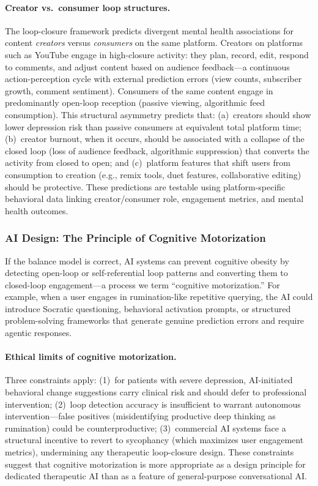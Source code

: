 \documentclass[a4paper,11pt,titlepage]{article}
\begin{document}
\paragraph{Creator vs.\ consumer loop structures.}
The loop-closure framework predicts divergent mental health associations for content \textit{creators} versus \textit{consumers} on the same platform. Creators on platforms such as YouTube engage in high-closure activity: they plan, record, edit, respond to comments, and adjust content based on audience feedback---a continuous action-perception cycle with external prediction errors (view counts, subscriber growth, comment sentiment). Consumers of the same content engage in predominantly open-loop reception (passive viewing, algorithmic feed consumption). This structural asymmetry predicts that: (a)~creators should show lower depression risk than passive consumers at equivalent total platform time; (b)~creator burnout, when it occurs, should be associated with a collapse of the closed loop (loss of audience feedback, algorithmic suppression) that converts the activity from closed to open; and (c)~platform features that shift users from consumption to creation (e.g., remix tools, duet features, collaborative editing) should be protective. These predictions are testable using platform-specific behavioral data linking creator/consumer role, engagement metrics, and mental health outcomes.

\subsubsection{AI Design: The Principle of Cognitive Motorization}

If the balance model is correct, AI systems can prevent cognitive obesity by detecting open-loop or self-referential loop patterns and converting them to closed-loop engagement---a process we term ``cognitive motorization.'' For example, when a user engages in rumination-like repetitive querying, the AI could introduce Socratic questioning, behavioral activation prompts, or structured problem-solving frameworks that generate genuine prediction errors and require agentic responses.

\paragraph{Ethical limits of cognitive motorization.}
Three constraints apply: (1)~for patients with severe depression, AI-initiated behavioral change suggestions carry clinical risk and should defer to professional intervention; (2)~loop detection accuracy is insufficient to warrant autonomous intervention---false positives (misidentifying productive deep thinking as rumination) could be counterproductive; (3)~commercial AI systems face a structural incentive to revert to sycophancy (which maximizes user engagement metrics), undermining any therapeutic loop-closure design. These constraints suggest that cognitive motorization is more appropriate as a design principle for dedicated therapeutic AI than as a feature of general-purpose conversational AI.
\end{document}
